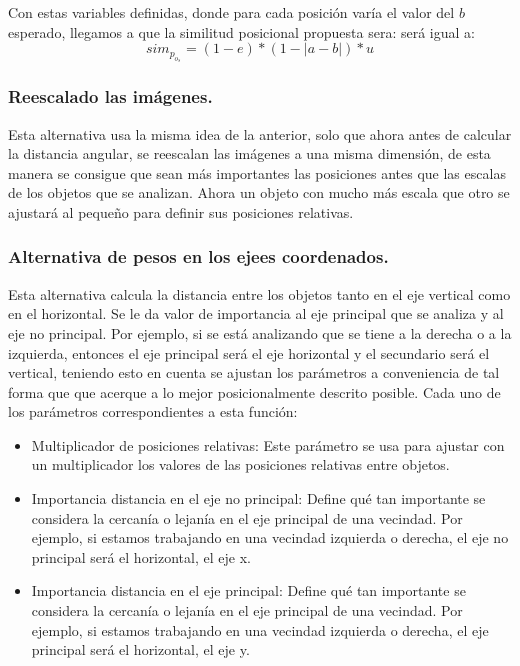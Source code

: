 Con estas variables definidas, donde para cada posici\'on var\'ia el valor del $b$ esperado, llegamos a que la similitud posicional propuesta sera: ser\'a igual a:
\[sim_p_o_s = (1-e)*(1- |a-b|) * u \]

\subsubsection{Reescalado las imágenes.}

Esta alternativa usa la misma idea de la anterior, solo que ahora antes de calcular la distancia angular, se reescalan las imágenes a una misma dimensión, de esta manera se consigue que sean más importantes las posiciones antes que las escalas de los objetos que se analizan. Ahora un objeto con mucho más escala que otro se ajustará al pequeño para definir sus posiciones relativas.

\subsubsection{Alternativa de pesos en los ejees coordenados.}

Esta alternativa calcula la distancia entre los objetos tanto en el eje vertical como en el horizontal. Se le da valor de importancia al eje principal que se analiza y al eje no principal. Por ejemplo, si se está analizando que se tiene a la derecha o a la izquierda, entonces el eje principal será el eje horizontal y el secundario será el vertical, teniendo esto en cuenta se ajustan los parámetros a conveniencia de tal forma que que acerque a lo mejor posicionalmente descrito posible. Cada uno de los parámetros correspondientes a esta función:


\begin{itemize}
    \item Multiplicador de posiciones relativas: Este parámetro se usa para ajustar con un multiplicador los valores de las posiciones relativas entre objetos.

    \item Importancia distancia en el eje no principal: Define qué tan importante se considera la cercanía o lejanía en el eje principal de una vecindad. Por ejemplo, si estamos trabajando en una vecindad izquierda o derecha, el eje no principal será el horizontal, el eje x.

    \item Importancia distancia en el eje principal: Define qué tan importante se considera la cercanía o lejanía en el eje principal de una vecindad. Por ejemplo, si estamos trabajando en una vecindad izquierda o derecha, el eje principal será el horizontal, el eje y.
\end{itemize}

